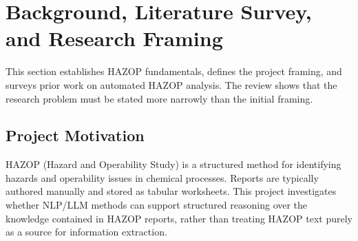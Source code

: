 %
%

\chapter[Background and Literature Survey]{Background, Literature Survey, and Research Framing}

This section establishes HAZOP fundamentals, defines the project framing, and
surveys prior work on automated HAZOP analysis. The review shows that the
research problem must be stated more narrowly than the initial framing.

\section{Project Motivation}
HAZOP (Hazard and Operability Study) is a structured method for identifying hazards and operability issues in chemical processes. Reports are typically authored manually and stored as tabular worksheets. This project investigates whether NLP/LLM methods can support structured reasoning over the knowledge contained in HAZOP reports, rather than treating HAZOP text purely as a source for information extraction.

